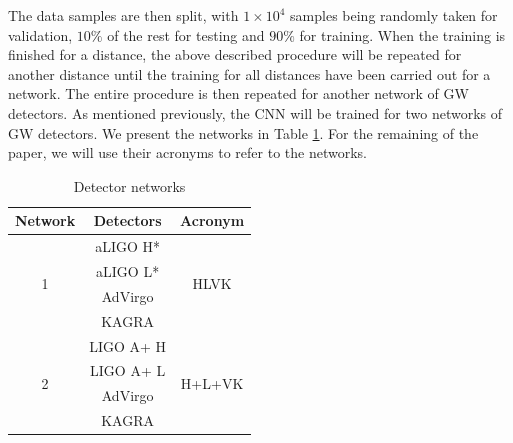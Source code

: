 \documentclass[aps,twocolumn,showpacs,groupedaddress, nofootinbib]{revtex4}  %
\begin{document}
The data samples are then split, with $1\times10^{4}$ samples being randomly taken for validation, $10\%$ of the rest for testing and $90\%$ for training.
When the training is finished for a distance, 
the above described procedure will be repeated for another distance until the training
for all distances have been carried out for a network.
The entire procedure is then repeated for another network of \ac{GW} detectors.
As mentioned previously, the \ac{CNN} will be trained for two networks of \ac{GW} detectors.
We present the networks in Table \ref{table:network}. For the remaining of the paper, we will use their acronyms to refer to the networks.
\begin{table}[]
\centering
\begin{threeparttable}
\caption{Detector networks}
\label{table:network}
\begin{tabular}{ccc}
\toprule
Network            & Detectors                & Acronym                 \\
\hline
\multirow{4}{*}{1} & \ac{aLIGO} H*    & \multirow{4}{*}{HLVK}   \\
                   & \ac{aLIGO} L* &                         \\
                   & \ac{AdVirgo}           &                         \\
                   & KAGRA                    &                         \\
                   \hline
\multirow{4}{*}{2} & LIGO A+ H          & \multirow{4}{*}{H+L+VK} \\
                   & LIGO A+ L       &                         \\
                   & \ac{AdVirgo}           &                         \\
                   & KAGRA                    &                         \\
\hline
\hline
\end{tabular}
\begin{tablenotes}
\setlength{}
\end{tablenotes}
\end{threeparttable}
\end{table}
\end{document}
